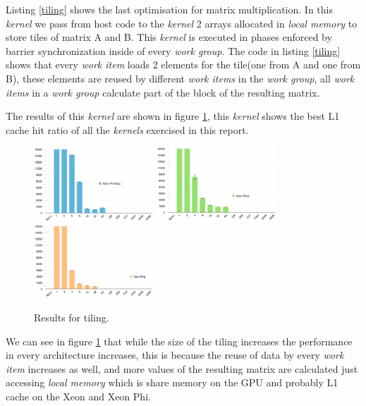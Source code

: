 \par{Listing \ref{tiling} shows the last optimisation for matrix multiplication. In
    this \emph{kernel} we pass from host code to the \emph{kernel} 
    2 arrays allocated in \emph{local
    memory} to store tiles of matrix A and B. This \emph{kernel} is executed in
    phases enforced by barrier synchronization inside of every \emph{work group}.
    The code in listing \ref{tiling} shows that every \emph{work item} loads
    2 elements for the tile(one from A and one from B), these elements are reused 
    by different \emph{work items} in the \emph{work group}, all \emph{work items
    } in a \emph{work group} calculate part of the block of the resulting matrix.}

\par{The results of this \emph{kernel} are shown in figure \ref{tilingResults},
    this \emph{kernel} shows the best L1 cache hit ratio of all the \emph{
        kernels} exercised in this report.}

\begin{figure}[!h]
    \centering
    \includegraphics[width=0.4\textwidth]{figures/phiTiling.png}
    \includegraphics[width=0.4\textwidth]{figures/xeonTiling.png}
    \includegraphics[width=0.4\textwidth]{figures/gpuTiling.png}
    \caption{Results for tiling.}
    \label{tilingResults}
\end{figure}

\par{We can see in figure \ref{tilingResults} that while the size of the tiling
    increases the performance in every architecture increases, this is because
    the reuse of data by every \emph{work item} increases as well, and more values
    of the resulting matrix are calculated just accessing \emph{local memory}
    which is share memory on the GPU and probably L1 cache on the Xeon and 
    Xeon Phi.}

